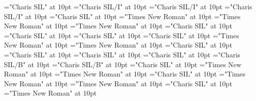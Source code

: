 \documentclass[a4paper,twoside]{article}
\begin{document}
\font\xitemexamplessensesensesentryletDatadicBody="Charis SIL" at 10pt
\font\examplesehxitemexamplessensesensesentryletDatadicBody="Charis SIL/I" at 10pt
\font\spansehexamplesehxitemexamplessensesensesentryletDatadicBody="Charis SIL/I" at 10pt
\font\spanenexamplesehxitemexamplessensesensesentryletDatadicBody="Charis SIL/I" at 10pt
\font\translationsxitemexamplessensesensesentryletDatadicBody="Charis SIL" at 10pt
\font\translationLcpttranslationsxitemexamplessensesensesentryletDatadicBody="Times New Roman" at 10pt
\font\xitempttranslationLcpttranslationsxitemexamplessensesensesentryletDatadicBody="Times New Roman" at 10pt
\font\spanptxitempttranslationLcpttranslationsxitemexamplessensesensesentryletDatadicBody="Times New Roman" at 10pt
\font\spanentranslationLcpttranslationsxitemexamplessensesensesentryletDatadicBody="Charis SIL" at 10pt
\font\xitementranslationLcpttranslationsxitemexamplessensesensesentryletDatadicBody="Charis SIL" at 10pt
\font\spanenxitementranslationLcpttranslationsxitemexamplessensesensesentryletDatadicBody="Charis SIL" at 10pt
\font\xitementryreftypeprimaryrefsentryletDatadicBody="Charis SIL" at 10pt
\font\LexEntryTypepublishStemEntryTypeAbbreviationPubptxitementryreftypeprimaryrefsentryletDatadicBody="Times New Roman" at 10pt
\font\spanptLexEntryTypepublishStemEntryTypeAbbreviationPubptxitementryreftypeprimaryrefsentryletDatadicBody="Times New Roman" at 10pt
\font\spanenLexEntryTypepublishStemEntryTypeAbbreviationPubptxitementryreftypeprimaryrefsentryletDatadicBody="Charis SIL" at 10pt
\font\relationssensesensesentryletDatadicBody="Charis SIL" at 10pt
\font\lexreftargetsrelationssensesensesentryletDatadicBody="Charis SIL" at 10pt
\font\alexreftargetsrelationssensesensesentryletDatadicBody="Charis SIL" at 10pt
\font\sensecrossrefsehalexreftargetsrelationssensesensesentryletDatadicBody="Charis SIL/B" at 10pt
\font\xsensexrefnumbersensecrossrefsehalexreftargetsrelationssensesensesentryletDatadicBody="Charis SIL/B" at 10pt
\font\spanenrelationssensesensesentryletDatadicBody="Charis SIL" at 10pt
\font{}="Times New Roman" at 10pt
\font\spanptdefinitionptsensesensesentryletDatadicBody="Times New Roman" at 10pt
\font\spanendefinitionptsensesensesentryletDatadicBody="Charis SIL" at 10pt
\font\translationpttranslationsxitemexamplessensesensesentryletDatadicBody="Times New Roman" at 10pt
\font\spanpttranslationpttranslationsxitemexamplessensesensesentryletDatadicBody="Times New Roman" at 10pt
\font\spanentranslationpttranslationsxitemexamplessensesensesentryletDatadicBody="Charis SIL" at 10pt
\font\translationLcpttranslationsexamplessensesensesentryletDatadicBody="Times New Roman" at 10pt
\end{document}

